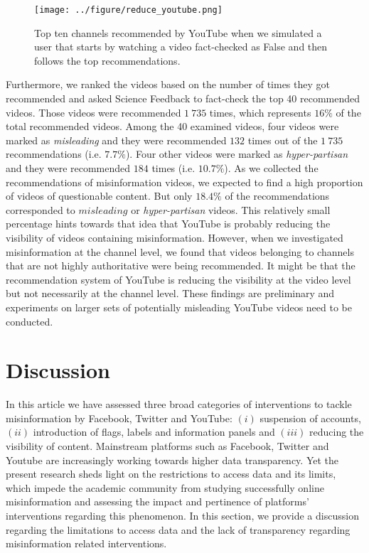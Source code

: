 \documentclass[Afour,sageh,times]{sagej}
\begin{document}
\begin{figure}[h]
	\begin{center}
		\texttt{[image: ../figure/reduce\_youtube.png]} 
	\end{center}
	\caption{Top ten channels recommended by YouTube when we simulated a user that starts by watching a video fact-checked as False and then follows the top recommendations.}
	\label{reduce_youtube}
\end{figure}

Furthermore, we ranked the videos based on the number of times they got recommended and asked Science Feedback to fact-check the top 40 recommended videos. 
Those videos were recommended $1~735$ times, which represents $16\%$ of the total recommended videos.
Among the 40 examined videos, four videos were marked as {\it misleading} and they were recommended $132$ times out of the $1~735$ recommendations (i.e. $7.7\%$).
Four other videos were marked as {\it hyper-partisan} and they were recommended $184$ times (i.e. $10.7\%$).
As we collected the recommendations of misinformation videos, we expected to find a high proportion of videos of questionable content.
But only {$18.4\%$} of the recommendations corresponded to $misleading$ or {\it hyper-partisan} videos.
This relatively small percentage hints towards that idea that YouTube is probably reducing the visibility of videos containing misinformation. 
However, when we investigated misinformation at the channel level, we found that videos belonging to channels that are not highly authoritative were being recommended.
It might be that the recommendation system of YouTube is reducing the visibility at the video level but not necessarily at the channel level. These findings are preliminary and experiments on larger sets of potentially misleading YouTube videos need to be conducted. 

\section{Discussion}

In this article we have assessed three broad categories of interventions to tackle misinformation by Facebook, Twitter and YouTube: $(i)$ suspension of accounts, $(ii)$ introduction of flags, labels and information panels and $(iii)$ reducing the visibility of content. Mainstream platforms such as Facebook, Twitter and Youtube are increasingly working towards higher data transparency. 
Yet the present research sheds light on the restrictions to access data and its limits, which impede the academic community from studying successfully online misinformation and assessing the impact and pertinence of platforms' interventions regarding this phenomenon. 
In this section, we provide a discussion regarding the limitations to access data and the lack of transparency regarding misinformation related interventions. 
\end{document}
